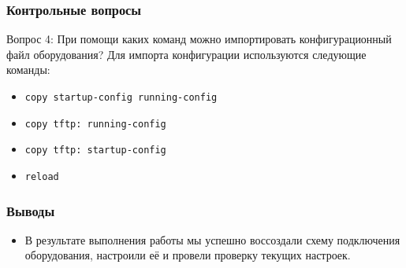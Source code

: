 \begin{frame}
\frametitle{Контрольные вопросы}

\begin{block}{Вопрос 4: При помощи каких команд можно импортировать конфигурационный файл оборудования?}
Для импорта конфигурации используются следующие команды:
\begin{itemize}
    \item \texttt{copy startup-config running-config}
    \item \texttt{copy tftp: running-config}
    \item \texttt{copy tftp: startup-config}
    \item \texttt{reload}
\end{itemize}
\end{block}
\end{frame}

\begin{frame}
\frametitle{Выводы}
\begin{itemize}
    \item В результате выполнения работы мы успешно воссоздали схему подключения оборудования, настроили её и провели проверку текущих настроек.
\end{itemize}
\end{frame}


